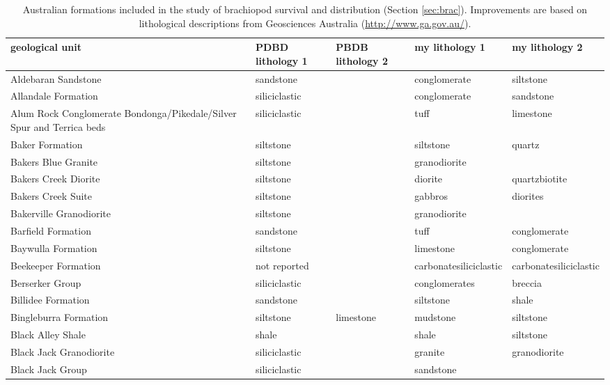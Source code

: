 \begin{tiny}
  \begin{longtable}{p{5cm} l l l l}
    \caption[Lithological assignments for Australian formations]{Australian formations included in the study of brachiopod survival and distribution (Section \ref{sec:brac}). Improvements are based on lithological descriptions from Geosciences Australia (\url{http://www.ga.gov.au/}).} \\ %
    geological unit & PDBD lithology 1 & PBDB lithology 2 & my lithology 1 & my lithology 2 \\ 
    \hline
    Aldebaran Sandstone & sandstone &  & conglomerate & siltstone \\ 
    Allandale Formation & siliciclastic &  & conglomerate & sandstone \\ 
    Alum Rock Conglomerate Bondonga/Pikedale/Silver Spur and Terrica beds & siliciclastic &  & tuff & limestone \\ 
    Baker Formation & siltstone &  & siltstone & quartz \\ 
    Bakers Blue Granite & siltstone &  & granodiorite &  \\ 
    Bakers Creek Diorite & siltstone &  & diorite & quartzbiotite \\ 
    Bakers Creek Suite & siltstone &  & gabbros & diorites \\ 
    Bakerville Granodiorite & siltstone &  & granodiorite &  \\ 
    Barfield Formation & sandstone &  & tuff & conglomerate \\ 
    Baywulla Formation & siltstone &  & limestone & conglomerate \\ 
    Beekeeper Formation & not reported &  & carbonatesiliciclastic & carbonatesiliciclastic \\ 
    Berserker Group & siliciclastic &  & conglomerates & breccia \\ 
    Billidee Formation & sandstone &  & siltstone & shale \\ 
    Bingleburra Formation & siltstone & limestone & mudstone & siltstone \\ 
    Black Alley Shale & shale &  & shale & siltstone \\ 
    Black Jack Granodiorite & siliciclastic &  & granite & granodiorite \\ 
    Black Jack Group & siliciclastic &  & sandstone &  \\ 

\end{longtable}
\end{tiny}
